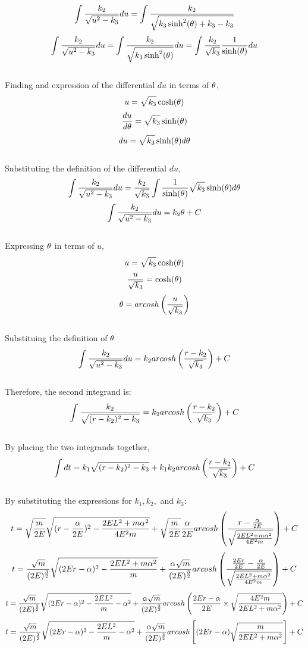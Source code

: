 \documentclass[class=report, 12pt, crop=false]{standalone}
\begin{document}
\begin{center}
$$\int \frac{k_2}{\sqrt{u^2 - k_3}} du = \int \frac{k_2}{\sqrt{k_3\sinh^2(\theta) + k_3 - k_3}}$$
$$\int \frac{k_2}{\sqrt{u^2 - k_3}} du = \int \frac{k_2}{\sqrt{k_3\sinh^2(\theta)}}du = \int \frac{k_2}{\sqrt{k_3}}\frac{1}{\sinh(\theta)}du$$
\\Finding and expression of the differential $du$ in terms of $\theta$,
$$u = \sqrt{k_3}\cosh(\theta)$$
$$\frac{du}{d\theta} = \sqrt{k_3}\sinh(\theta)$$
$$du = \sqrt{k_3}\sinh(\theta)d\theta$$
\\Substituting the definition of the differential $du$,
$$\int \frac{k_2}{\sqrt{u^2 - k_3}} du = \frac{k_2}{\sqrt{k_3}} \int \frac{1}{\sinh(\theta)}\sqrt{k_3}\sinh(\theta)d\theta$$
$$\int \frac{k_2}{\sqrt{u^2 - k_3}} du = k_2 \theta + C$$
\\Expressing $\theta$ in terms of $u$,
$$u = \sqrt{k_3}\cosh(\theta)$$
$$\frac{u}{\sqrt{k_3}} = \cosh(\theta)$$
$$\theta = arcosh\left(\frac{u}{\sqrt{k_3}}\right)$$
\\Substituing the definition of $\theta$
$$\int \frac{k_2}{\sqrt{u^2 - k_3}} du = k_2 arcosh\left(\frac{r - k_2}{\sqrt{k_3}}\right) + C$$
\\Therefore, the second integrand is:
$$\int \frac{k_2}{\sqrt{(r - k_2)^2 - k_3}} = k_2 arcosh\left(\frac{r - k_2}{\sqrt{k_3}}\right) + C$$
\\By placing the two integrands together, 
$$\int dt= k_1 \sqrt{(r - k_2)^2 - k_3} + k_1 k_2 arcosh\left(\frac{r - k_2}{\sqrt{k_3}}\right) + C $$
\\By substituting the expressions for $k_1, k_2,$ and $k_3$:
$$t= \sqrt{\frac{m}{2E}} \sqrt{(r - \frac{\alpha}{2E})^2 - \frac{2E L^2 + m\alpha ^ 2}{4 E^2 m}} + \sqrt{\frac{m}{2E}} \frac{\alpha}{2E} arcosh\left(\frac{r - \frac{\alpha}{2E}}{\sqrt{\frac{2E L^2 + m\alpha ^ 2}{4 E^2 m}}}\right) + C $$
$$t= \frac{\sqrt{m}}{(2E)^\frac{3}{2}} \sqrt{(2Er - \alpha)^2 - \frac{2E L^2 + m\alpha ^ 2}{m}} + \frac{\alpha\sqrt{m}}{(2E)^\frac{3}{2}}  arcosh\left(\frac{\frac{2Er}{2E} - \frac{\alpha}{2E}}{\sqrt{\frac{2E L^2 + m\alpha ^ 2}{4 E^2 m}}}\right) + C $$
$$t= \frac{\sqrt{m}}{(2E)^\frac{3}{2}} \sqrt{(2Er - \alpha)^2 - \frac{2E L^2}{m} - \alpha^2} + \frac{\alpha\sqrt{m}}{(2E)^\frac{3}{2}}  arcosh\left(\frac{2Er - \alpha}{2E} \times \sqrt{\frac{4 E^2 m}{2E L^2 + m\alpha ^ 2}}\right) + C $$
$$t= \frac{\sqrt{m}}{(2E)^\frac{3}{2}} \sqrt{(2Er - \alpha)^2 - \frac{2E L^2}{m} - \alpha^2} + \frac{\alpha\sqrt{m}}{(2E)^\frac{3}{2}}  arcosh\left[(2Er - \alpha)\sqrt{\frac{m}{2E L^2 + m\alpha ^ 2}}  \right] + C $$
\end{center}
\end{document}
